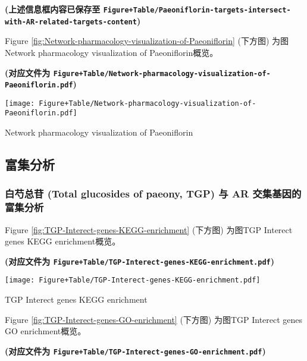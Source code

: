 \documentclass[
]{article}
\begin{document}
\textbf{(上述信息框内容已保存至 \texttt{Figure+Table/Paeoniflorin-targets-intersect-with-AR-related-targets-content})}

Figure \ref{fig:Network-pharmacology-visualization-of-Paeoniflorin} (下方图) 为图Network pharmacology visualization of Paeoniflorin概览。

\textbf{(对应文件为 \texttt{Figure+Table/Network-pharmacology-visualization-of-Paeoniflorin.pdf})}

\def\@captype{figure}
\begin{center}
\texttt{[image: Figure+Table/Network-pharmacology-visualization-of-Paeoniflorin.pdf]}
\caption{Network pharmacology visualization of Paeoniflorin}\label{fig:Network-pharmacology-visualization-of-Paeoniflorin}
\end{center}

\hypertarget{ux5bccux96c6ux5206ux6790}{%
\subsection{富集分析}\label{ux5bccux96c6ux5206ux6790}}

\hypertarget{ux767dux828dux603bux82f7-total-glucosides-of-paeony-tgp-ux4e0e-ar-ux4ea4ux96c6ux57faux56e0ux7684ux5bccux96c6ux5206ux6790}{%
\subsubsection{白芍总苷 (Total glucosides of paeony, TGP) 与 AR 交集基因的富集分析}\label{ux767dux828dux603bux82f7-total-glucosides-of-paeony-tgp-ux4e0e-ar-ux4ea4ux96c6ux57faux56e0ux7684ux5bccux96c6ux5206ux6790}}

Figure \ref{fig:TGP-Interect-genes-KEGG-enrichment} (下方图) 为图TGP Interect genes KEGG enrichment概览。

\textbf{(对应文件为 \texttt{Figure+Table/TGP-Interect-genes-KEGG-enrichment.pdf})}

\def\@captype{figure}
\begin{center}
\texttt{[image: Figure+Table/TGP-Interect-genes-KEGG-enrichment.pdf]}
\caption{TGP Interect genes KEGG enrichment}\label{fig:TGP-Interect-genes-KEGG-enrichment}
\end{center}

Figure \ref{fig:TGP-Interect-genes-GO-enrichment} (下方图) 为图TGP Interect genes GO enrichment概览。

\textbf{(对应文件为 \texttt{Figure+Table/TGP-Interect-genes-GO-enrichment.pdf})}
\end{document}
